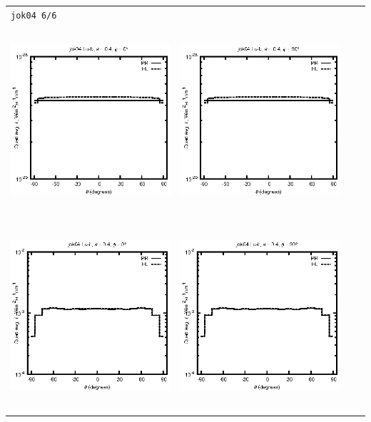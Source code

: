 \begin{tabular}{c c c c}
\multicolumn{4}{l}{\texttt{jok04 6/6}} \\
\includegraphics[height=7cm]{../eps/jok04_Lu_b_fwd.eps} &
\includegraphics[height=7cm]{../eps/jok04_Lu_b_cross.eps} \\
\includegraphics[height=7cm]{../eps/jok04_Lu_it_fwd.eps} &
\includegraphics[height=7cm]{../eps/jok04_Lu_it_cross.eps} \\

\end{tabular}
